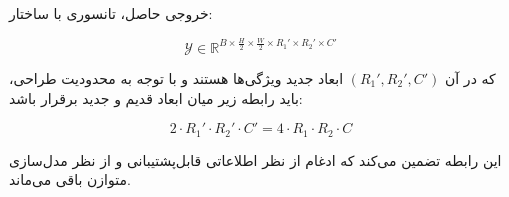 خروجی حاصل، تانسوری با ساختار:

\[
\mathcal{Y} \in \mathbb{R}^{B \times \frac{H}{2} \times \frac{W}{2} \times R_1' \times R_2' \times C'}
\]

که در آن $(R_1', R_2', C')$ ابعاد جدید ویژگی‌ها هستند و با توجه به محدودیت طراحی، باید رابطه زیر میان ابعاد قدیم و جدید برقرار باشد:

\[
2 \cdot R_1' \cdot R_2' \cdot C' = 4 \cdot R_1 \cdot R_2 \cdot C
\]

این رابطه تضمین می‌کند که ادغام از نظر اطلاعاتی قابل‌پشتیبانی و از نظر مدل‌سازی متوازن باقی می‌ماند.


